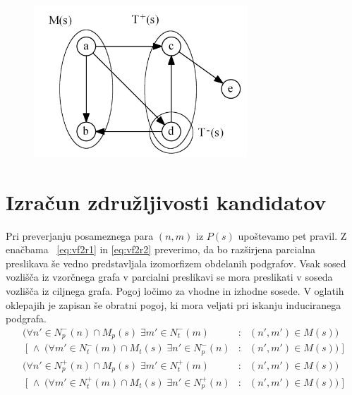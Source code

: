 \documentclass[a4paper, 12pt, ]{book}
\begin{document}
	\begin{figure}
	\begin{center}
	\includegraphics[width=8cm]{img/graph_t_in_out.png}
	\end{center}
	\caption{}
	\label{pic_t_in_out}
	\end{figure}



	\section{Izračun združljivosti kandidatov}
	\label{vf2:feasible}

	Pri preverjanju posameznega para $(n,m)$ iz $P(s)$ upoštevamo pet pravil. Z enačbama ~\ref{eq:vf2r1} in \ref{eq:vf2r2} preverimo, da bo razširjena
	parcialna preslikava še vedno predstavljala izomorfizem obdelanih podgrafov. Vsak sosed vozlišča iz vzorčnega grafa v parcialni preslikavi se mora
	preslikati v soseda vozlišča iz ciljnega grafa. Pogoj ločimo za vhodne in izhodne sosede. V oglatih oklepajih je zapisan
	še obratni pogoj, ki mora veljati pri iskanju induciranega podgrafa.
	\begin{equation}
	\label{eq:vf2r1}
	\begin{array}{rcl}
	(\forall n' \in N_p^-(n) \cap M_p(s) \; \exists m' \in N_t^-(m)    \!\!\!&:&\!\!	 (n', m') \in M(s)) \\
	\;[\; \wedge \; (\forall m' \in N_t^-(m) \cap M_t(s)\; \exists n' \in N_p^-(n) \!\!\!&:&\!\! (n', m') \in M(s)) \;]
	\end{array}
	\end{equation}
	\begin{equation}
	\label{eq:vf2r2}
	\begin{array}{rcl}
	(\forall n' \in N_p^+(n)  \cap M_p(s)  \; \exists m' \in N_t^+(m)    \!\!\!&:&\!\!	 (n', m') \in M(s)) \\
	\;[\; \wedge \; (\forall m' \in N_t^+(m) \cap  M_t(s)\; \exists n' \in N_p^+(n)     \!\!\!&:&\!\!	 (n', m') \in M(s)) \;]
	\end{array}
	\end{equation}
	
\end{document}
